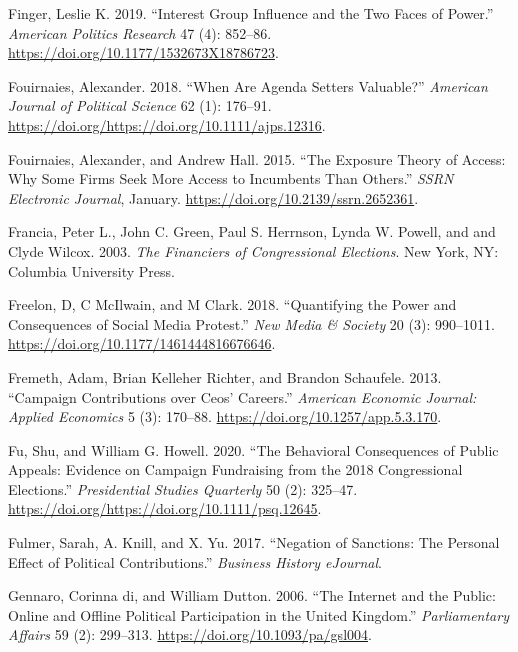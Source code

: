 \documentclass[12pt,]{article}
\begin{document}
\leavevmode\hypertarget{ref-finger2019}{}%
Finger, Leslie K. 2019. ``Interest Group Influence and the Two Faces of
Power.'' \emph{American Politics Research} 47 (4): 852--86.
\url{https://doi.org/10.1177/1532673X18786723}.

\leavevmode\hypertarget{ref-fouirnaies2018}{}%
Fouirnaies, Alexander. 2018. ``When Are Agenda Setters Valuable?''
\emph{American Journal of Political Science} 62 (1): 176--91.
\url{https://doi.org/https://doi.org/10.1111/ajps.12316}.

\leavevmode\hypertarget{ref-fouirnaies2015}{}%
Fouirnaies, Alexander, and Andrew Hall. 2015. ``The Exposure Theory of
Access: Why Some Firms Seek More Access to Incumbents Than Others.''
\emph{SSRN Electronic Journal}, January.
\url{https://doi.org/10.2139/ssrn.2652361}.

\leavevmode\hypertarget{ref-francia2003}{}%
Francia, Peter L., John C. Green, Paul S. Herrnson, Lynda W. Powell, and
and Clyde Wilcox. 2003. \emph{The Financiers of Congressional
Elections}. New York, NY: Columbia University Press.

\leavevmode\hypertarget{ref-freelon2018}{}%
Freelon, D, C McIlwain, and M Clark. 2018. ``Quantifying the Power and
Consequences of Social Media Protest.'' \emph{New Media \& Society} 20
(3): 990--1011. \url{https://doi.org/10.1177/1461444816676646}.

\leavevmode\hypertarget{ref-fremeth2013}{}%
Fremeth, Adam, Brian Kelleher Richter, and Brandon Schaufele. 2013.
``Campaign Contributions over Ceos' Careers.'' \emph{American Economic
Journal: Applied Economics} 5 (3): 170--88.
\url{https://doi.org/10.1257/app.5.3.170}.

\leavevmode\hypertarget{ref-fu2020}{}%
Fu, Shu, and William G. Howell. 2020. ``The Behavioral Consequences of
Public Appeals: Evidence on Campaign Fundraising from the 2018
Congressional Elections.'' \emph{Presidential Studies Quarterly} 50 (2):
325--47. \url{https://doi.org/https://doi.org/10.1111/psq.12645}.

\leavevmode\hypertarget{ref-fulmer2017}{}%
Fulmer, Sarah, A. Knill, and X. Yu. 2017. ``Negation of Sanctions: The
Personal Effect of Political Contributions.'' \emph{Business History
eJournal}.

\leavevmode\hypertarget{ref-degennaro2006}{}%
Gennaro, Corinna di, and William Dutton. 2006. ``The Internet and the
Public: Online and Offline Political Participation in the United
Kingdom.'' \emph{Parliamentary Affairs} 59 (2): 299--313.
\url{https://doi.org/10.1093/pa/gsl004}.
\end{document}
